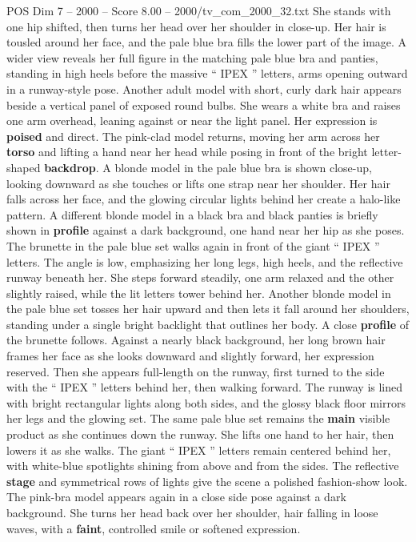 \begin{textsample}{POS Dim 7 – 2000 – Score 8.00 – 2000/tv\_com\_2000\_32.txt}
She stands with one hip shifted, then turns her head over her shoulder in close-up.
Her hair is tousled around her face, and the pale blue bra fills the lower part of the image.
A wider view reveals her full figure in the matching pale blue bra and panties, standing in high heels before the massive “ IPEX ” letters, arms opening outward in a runway-style pose.
Another adult model with short, curly dark hair appears beside a vertical panel of exposed round bulbs.
She wears a white bra and raises one arm overhead, leaning against or near the light panel.
Her expression is \textbf{poised} and direct.
The pink-clad model returns, moving her arm across her \textbf{torso} and lifting a hand near her head while posing in front of the bright letter-shaped \textbf{backdrop}.
A blonde model in the pale blue bra is shown close-up, looking downward as she touches or lifts one strap near her shoulder.
Her hair falls across her face, and the glowing circular lights behind her create a halo-like pattern.
A different blonde model in a black bra and black panties is briefly shown in \textbf{profile} against a dark background, one hand near her hip as she poses.
The brunette in the pale blue set walks again in front of the giant “ IPEX ” letters.
The angle is low, emphasizing her long legs, high heels, and the reflective runway beneath her.
She steps forward steadily, one arm relaxed and the other slightly raised, while the lit letters tower behind her.
Another blonde model in the pale blue set tosses her hair upward and then lets it fall around her shoulders, standing under a single bright backlight that outlines her body.
A close \textbf{profile} of the brunette follows.
Against a nearly black background, her long brown hair frames her face as she looks downward and slightly forward, her expression reserved.
Then she appears full-length on the runway, first turned to the side with the “ IPEX ” letters behind her, then walking forward.
The runway is lined with bright rectangular lights along both sides, and the glossy black floor mirrors her legs and the glowing set.
The same pale blue set remains the \textbf{main} visible product as she continues down the runway.
She lifts one hand to her hair, then lowers it as she walks.
The giant “ IPEX ” letters remain centered behind her, with white-blue spotlights shining from above and from the sides.
The reflective \textbf{stage} and symmetrical rows of lights give the scene a polished fashion-show look.
The pink-bra model appears again in a close side pose against a dark background.
She turns her head back over her shoulder, hair falling in loose waves, with a \textbf{faint}, controlled smile or softened expression.

\end{textsample}
